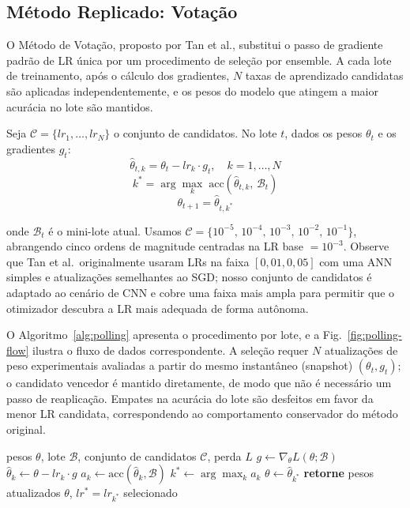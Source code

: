 \documentclass[conference]{IEEEtran}
\begin{document}
\subsection{Método Replicado: Votação}

O Método de Votação, proposto por Tan et al., substitui o passo de gradiente padrão de LR única por um procedimento de seleção por ensemble. A cada lote de treinamento, após o cálculo dos gradientes, $N$ taxas de aprendizado candidatas são aplicadas independentemente, e os pesos do modelo que atingem a maior acurácia no lote são mantidos.

Seja $\mathcal{C} = \{lr_1, \ldots, lr_N\}$ o conjunto de candidatos. No lote $t$, dados os pesos $\theta_t$ e os gradientes $g_t$:
\begin{equation}
\hat{\theta}_{t,k} = \theta_t - lr_k \cdot g_t, \quad k = 1,\ldots,N
\end{equation}
\begin{equation}
k^{*} = \arg\max_{k} \; \mathrm{acc}(\hat{\theta}_{t,k},\, \mathcal{B}_t)
\end{equation}
\begin{equation}
\theta_{t+1} = \hat{\theta}_{t,k^{*}}
\end{equation}

onde $\mathcal{B}_t$ é o mini-lote atual. Usamos $\mathcal{C} = \{10^{-5},\, 10^{-4},\, 10^{-3},\, 10^{-2},\, 10^{-1}\}$, abrangendo cinco ordens de magnitude centradas na LR base $= 10^{-3}$. Observe que Tan et al.\ originalmente usaram LRs na faixa $[0{,}01, 0{,}05]$ com uma ANN simples e atualizações semelhantes ao SGD; nosso conjunto de candidatos é adaptado ao cenário de CNN e cobre uma faixa mais ampla para permitir que o otimizador descubra a LR mais adequada de forma autônoma.

O Algoritmo~\ref{alg:polling} apresenta o procedimento por lote, e a Fig.~\ref{fig:polling-flow} ilustra o fluxo de dados correspondente. A seleção requer $N$ atualizações de peso experimentais avaliadas a partir do mesmo instantâneo (snapshot) $(\theta_t, g_t)$; o candidato vencedor é mantido diretamente, de modo que não é necessário um passo de reaplicação. Empates na acurácia do lote são desfeitos em favor da menor LR candidata, correspondendo ao comportamento conservador do método original.

\begin{algorithm}[htbp]
\caption{Passo de Votação (método base, um lote)}
\label{alg:polling}
\begin{algorithmic}[1]
\REQUIRE pesos $\theta$, lote $\mathcal{B}$, conjunto de candidatos $\mathcal{C}$, perda $L$
\STATE $g \leftarrow \nabla_\theta L(\theta; \mathcal{B})$ 
    \STATE $\hat{\theta}_k \leftarrow \theta - lr_k \cdot g$ 
    \STATE $a_k \leftarrow \mathrm{acc}(\hat{\theta}_k, \mathcal{B})$
\ENDFOR
\STATE $k^{*} \leftarrow \arg\max_k a_k$ 
\STATE $\theta \leftarrow \hat{\theta}_{k^{*}}$
\STATE \textbf{retorne} pesos atualizados $\theta$, $lr^{*} = lr_{k^{*}}$ selecionado
\end{algorithmic}
\end{algorithm}
\end{document}

